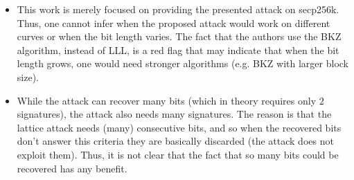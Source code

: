 \begin{itemize}
\item This work is merely focused on providing the presented attack on secp256k. Thus, one cannot infer when the proposed attack would work on different curves or when
the bit length varies. The fact that the authors use the BKZ algorithm, instead of LLL, is a red flag that may indicate that when the bit length grows, one would need stronger algorithms (e.g. BKZ with larger block size).
\item While the attack can recover many bits (which in theory requires only $2$ signatures), the attack also needs many signatures. The reason is that the lattice attack needs (many) consecutive bits, and so when the recovered bits don't answer this criteria they are basically discarded (the attack does not exploit them). Thus, it is not clear that the fact that so many bits could be recovered has any benefit. 
\end{itemize}


